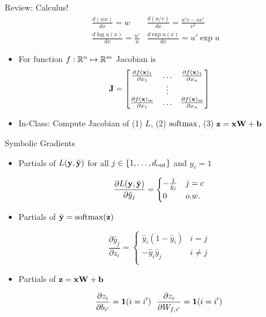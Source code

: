 \documentclass{beamer}
\begin{document}
\begin{frame}{Review: Calculus!}
  \begin{align*} 
    &\frac{d (w x)  }{d x} = w   & \frac{d (u/v) }{d x} = \frac{u'v -   uv'} {v^2}  \\
   &\frac{d \log u(x) }{d x} = \frac{u'}{u}  & \frac{d \exp u(x) }{d x} =  u' \exp u  
  \end{align*}

  \begin{itemize}
  \item For function $f: \mathbb{R}^n \mapsto \mathbb{R}^m $ Jacobian is 
    \[ \mathbf{J} = \begin{bmatrix} \frac{\partial f(\mathbf{x})_1}{\partial x_1} & \ldots&  \frac{\partial f(\mathbf{x})_1}{\partial x_n} \\ 
      &\vdots& \\
      \frac{\partial f(\mathbf{x})_m}{\partial x_1} & \ldots &  \frac{\partial f(\mathbf{x})_m}{\partial x_n} \\ 
    \end{bmatrix}\]

     \item In-Class: Compute Jacobian of (1) $L$,  (2) $\softmax$, (3) $\mathbf{z} = \mathbf{x} \mathbf{W} + \mathbf{b}$ 
  \end{itemize}
  
  
\end{frame}


\begin{frame}{Symbolic Gradients}
  
  \begin{itemize}
  \item 

  Partials of $L(\mathbf{y}, \hat{\mathbf{y}})$ for all $j \in \{1, \ldots, {d_{\mathrm{out}}}\}$ and $y_c = 1$ 

  \[ \frac{\partial L(\mathbf{y}, \hat{\mathbf{y}})}{\partial \hat{y}_j} = \begin{cases}-\frac{1} {\hat{y}_j} & j = c\\ 0 & o.w. \end{cases}  \]
  \pause 

  \item
    Partials of $\hat{\boldy} = \softmax(\boldz)$ 

  \[ \frac{\partial \hat{y}_j }{\partial z_i} =
    \begin{cases}
      \hat{y}_i (1 - \hat{y}_i) & i = j\\
      - \hat{y}_i \hat{y}_j & i \neq j \\
    \end{cases} \]

  \pause 
  \item Partials of $\mathbf{z}  = \mathbf{x} \mathbf{W} + \mathbf{b} $ 

  \[ \frac{\partial z_i }{\partial b_{i'}} = \mathbf{1}(i = i') \ \  \frac{\partial z_i }{\partial W_{f, i'}} = \mathbf{1}(i = i') \]

  \end{itemize}

\end{frame}
\end{document}
